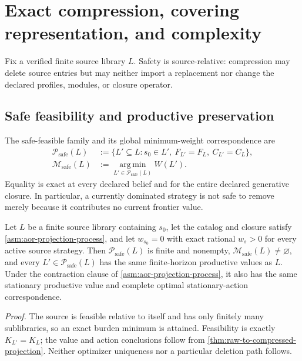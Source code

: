 \section{Exact compression, covering representation, and complexity}
\label{sec:cover-complexity}
\label{sec:compression}

Fix a verified finite source library \(L\).  Safety is source-relative:
compression may delete source entries but may neither import a replacement nor
change the declared profiles, modules, or closure operator.

\subsection{Safe feasibility and productive preservation}

The safe-feasible family and its global minimum-weight correspondence are
\begin{align}
 \mathcal P_{\mathrm{safe}}(L)
   &:=\{L'\subseteq L:s_0\in L',\
          F_{L'}=F_L,\ C_{L'}=C_L\},
   \label{eq:safe-compression-family}\\
 \mathcal M_{\mathrm{safe}}(L)
   &:=\operatorname*{arg\,min}_{L'\in\mathcal P_{\mathrm{safe}}(L)}W(L').
   \label{eq:minimum-safe-compression}
\end{align}
Equality is exact at every declared belief and for the entire declared
generative closure.  In particular, a currently dominated strategy is not
safe to remove merely because it contributes no current frontier value.

\begin{theorem}
\label{thm:minimum-safe-compression}
Let \(L\) be a finite source library containing \(s_0\), let the catalog and
closure satisfy \cref{asm:aor-projection-process}, and let
\(w_{s_0}=0\) with exact rational \(w_s>0\) for every active source strategy.
Then \(\mathcal P_{\mathrm{safe}}(L)\) is finite and nonempty,
\(\mathcal M_{\mathrm{safe}}(L)\neq\varnothing\), and every
\(L'\in\mathcal P_{\mathrm{safe}}(L)\) has the same finite-horizon productive
values as \(L\).  Under the contraction clause of
\cref{asm:aor-projection-process}, it also has the same stationary productive
value and complete optimal stationary-action correspondence.
\end{theorem}

\noindent\emph{Proof.}
The source is feasible relative to itself and has only finitely many
sublibraries, so an exact burden minimum is attained.  Feasibility is exactly
\(K_{L'}=K_L\); the value and action conclusions follow from
\cref{thm:raw-to-compressed-projection}.  Neither optimizer uniqueness nor a
particular deletion path follows.

